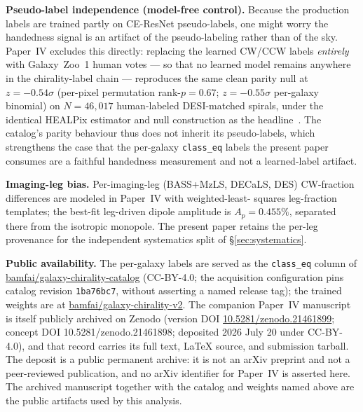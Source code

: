 \documentclass[twocolumn,linenumbers]{aastex702}
\begin{document}
\textbf{Pseudo-label independence (model-free control).} Because the
production labels are trained partly on CE-ResNet pseudo-labels, one might
worry the handedness signal is an artifact of the pseudo-labeling rather than
of the sky. Paper~IV excludes this directly: replacing the learned CW/CCW
labels \emph{entirely} with Galaxy~Zoo~1 human votes --- so that no learned
model remains anywhere in the chirality-label chain --- reproduces the same
clean parity null at $z=-0.54\sigma$ (per-pixel permutation rank-$p=0.67$;
$z=-0.55\sigma$ per-galaxy binomial) on $N=46{,}017$ human-labeled DESI-matched
spirals, under the identical HEALPix estimator and null construction as the
headline~\cite{golden_chirality_2026}. The catalog's parity behaviour thus
does not inherit its pseudo-labels, which strengthens the case that the
per-galaxy \texttt{class\_eq} labels the present paper consumes are a faithful
handedness measurement and not a learned-label artifact.

\textbf{Imaging-leg bias.} Per-imaging-leg (BASS+MzLS, DECaLS, DES)
CW-fraction differences are modeled in Paper~IV with weighted-least-
squares leg-fraction templates; the best-fit leg-driven dipole amplitude
is $A_p=0.455\%$, separated there from the isotropic monopole. The
present paper retains the per-leg provenance for the independent
systematics split of \S\ref{sec:systematics}.

\textbf{Public availability.} The per-galaxy labels are served as the
\texttt{class\_eq} column of
\href{https://huggingface.co/datasets/bamfai/galaxy-chirality-catalog}{bamfai/galaxy-chirality-catalog}
(CC-BY-4.0; the acquisition configuration pins catalog revision
\texttt{1ba76bc7}, without asserting a named release tag); the trained weights are at
\href{https://huggingface.co/bamfai/galaxy-chirality-v2}{bamfai/galaxy-chirality-v2}.
The companion Paper~IV manuscript is itself publicly archived on Zenodo
(version DOI
\href{https://doi.org/10.5281/zenodo.21461899}{10.5281/zenodo.21461899};
concept DOI 10.5281/zenodo.21461898; deposited 2026 July 20 under CC-BY-4.0),
and that record carries its full text, \LaTeX{} source, and submission
tarball. The deposit is a public permanent archive: it is not an arXiv
preprint and not a peer-reviewed publication, and no arXiv identifier for
Paper~IV is asserted here. The archived manuscript together with the catalog
and weights named above are the public artifacts used by this analysis.
\end{document}
